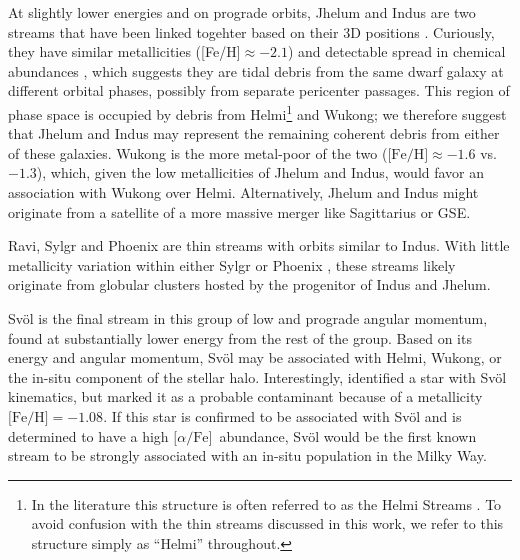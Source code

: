 \documentclass[twocolumn]{aastex63}
\newcommand{\feh}{\ensuremath{\textrm{[Fe/H]}}}
\newcommand{\afe}{\ensuremath{\textrm{[$\alpha$/Fe]}}}
\begin{document}
At slightly lower energies and on prograde orbits, Jhelum and Indus are two streams that have been linked togehter based on their 3D positions \citep{bonaca2019b}.
Curiously, they have similar metallicities ([Fe/H]$\approx-2.1$) and detectable spread in chemical abundances \citep{ji2020}, which suggests they are tidal debris from the same dwarf galaxy at different orbital phases, possibly from separate pericenter passages.
This region of phase space is occupied by debris from Helmi\footnote{In the literature this structure is often referred to as the Helmi Streams \citep{helmi1999}. To avoid confusion with the thin streams discussed in this work, we refer to this structure simply as ``Helmi'' throughout.} and Wukong; we therefore suggest that Jhelum and Indus may represent the remaining coherent debris from either of these galaxies.
Wukong is the more metal-poor of the two ($\feh\approx-1.6$ vs. $-1.3$), which, given the low metallicities of Jhelum and Indus, would favor an association with Wukong over Helmi.
Alternatively, Jhelum and Indus might originate from a satellite of a more massive merger like Sagittarius or GSE.


Ravi, Sylgr and Phoenix are thin streams with orbits similar to Indus.
With little metallicity variation within either Sylgr or Phoenix \citep{ibata2019, wan2020}, these streams likely originate from globular clusters hosted by the progenitor of Indus and Jhelum.

Sv\" ol is the final stream in this group of low and prograde angular momentum, found at substantially lower energy from the rest of the group.
Based on its energy and angular momentum, Sv\" ol may be associated with Helmi, Wukong, or the in-situ component of the stellar halo.
Interestingly, \citet{ibata2019} identified a star with Sv\" ol kinematics, but marked it as a probable contaminant because of a metallicity $\feh=-1.08$.
If this star is confirmed to be associated with Sv\" ol and is determined to have a high \afe\ abundance, Sv\" ol would be the first known stream to be strongly associated with an in-situ population in the Milky Way. 
\end{document}
